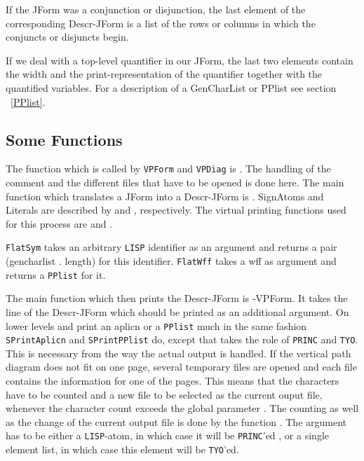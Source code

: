 If the JForm was a conjunction or disjunction, the last element of the 
corresponding Descr-JForm is a list of the rows or columns in which the
conjuncts or disjuncts begin.

If we deal with a top-level quantifier in our JForm, the last two
elements contain the width and the print-representation of the
quantifier together with the quantified variables.  For a description of
a GenCharList or PPlist see section ~\ref{PPlist}.

\subsection{Some Functions}

The function which is called by {\tt VPForm} and {\tt VPDiag} is
.  The handling of the comment and the different
files that have to be opened is done here.
The main function which translates a JForm into
a Descr-JForm is
.  SignAtoms and Literals are described by
 and  , respectively.  The
virtual printing functions used for this process are 
and .

{\tt FlatSym} takes an arbitrary {\tt LISP} identifier as an argument and
returns a pair (gencharlist . length) for this identifier.
{\tt FlatWff} takes a wff as argument and returns a {\tt PPlist} for
it.

The main function which then prints the Descr-JForm is -VPForm.
It takes the line of the Descr-JForm which should be printed as an
additional argument.  On lower levels  and
 print an aplicn or a {\tt PPlist} much in the same fashion
{\tt SPrintAplicn} and {\tt SPrintPPlist} do, except that  takes
the role of {\tt PRINC} and {\tt TYO}.  This is necessary from the way
the actual output is handled.  If the vertical path diagram does
not fit on one page, several temporary files are opened and each
file contains the information for one of the pages.  This means 
that the characters have to be counted and a new file to be selected
as the current ouput file, whenever the character count exceeds
the global parameter .  The counting
as well as the change of the current output file is done by the 
function .  The argument has to be either a {\tt LISP}-atom,
in which case it will be {\tt PRINC}'ed , or a single element list, 
in which case this element will be {\tt TYO}'ed.


